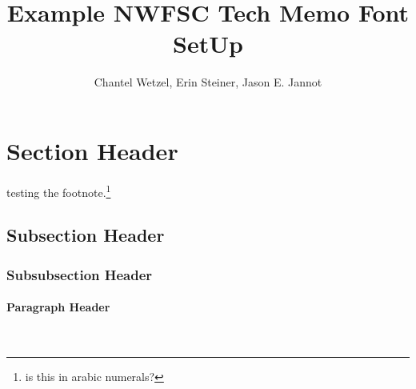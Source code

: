 \documentclass[12pt]{article}
\title{\textcolor[cmyk]{1.00,0.83,0.41,0.36}{Example NWFSC Tech Memo Font SetUp}}
\author{Chantel Wetzel, Erin Steiner, Jason E. Jannot}
\newcommand{\paragraphnewline}[1]{\paragraph{#1}\mbox{}\\}
\begin{document}
\maketitle
\normalfont %
\normalsize %

	
\section{Section Header}
\lipsum[1]
testing the footnote.\footnote{is this in arabic numerals?}
\subsection{Subsection Header}
\lipsum[2]
\subsubsection{Subsubsection Header}
\lipsum[3]
\paragraphnewline{Paragraph Header}
\lipsum[4]
\end{document}
